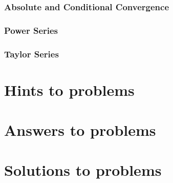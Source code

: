 \documentclass[12pt,letterpaper, openany]{book}
\begin{document}
\section{Absolute and Conditional Convergence}

\section{Power Series}

\section{Taylor Series}




\newpage
\part{Hints to problems}


\newpage
\part{Answers to problems}


\newpage
\part{Solutions to problems}

\end{document}
